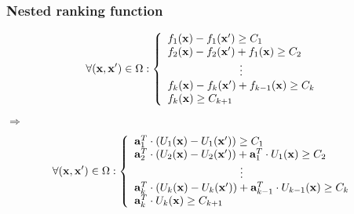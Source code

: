 \begin{frame}
\frametitle{Nested ranking function}
\begin{equation}
		\forall (\varsvec,\varsvec') \in \Omega :
		\left\{
			\begin{array}{ll}
				\affrank_{1}(\varsvec) - \affrank_{1}(\varsvec') \geq C_{1} \\
				\affrank_{2}(\varsvec) - \affrank_{2}(\varsvec') + \affrank_{1}(\varsvec) \geq C_{2} \\
				\multicolumn{1}{c}{\vdots} \\
				\affrank_{k}(\varsvec) - \affrank_{k}(\varsvec') + \affrank_{k-1}(\varsvec) \geq C_{k} \\
				\affrank_{k}(\varsvec) \geq C_{k+1}
			\end{array}
		\right. \notag
		\label{eq:nestedProgress}
\end{equation}
$\Longrightarrow$
\begin{equation}
\forall (\varsvec,\varsvec') \in \Omega :
\left\{
	\begin{array}{ll}
		\vect{a}^{T}_{1} \cdot (U_{1}(\varsvec) - U_{1}(\varsvec')) \geq C_{1} \\
		\vect{a}^{T}_{2} \cdot (U_{2}(\varsvec) - U_{2}(\varsvec')) + \vect{a}^{T}_{1} \cdot U_{1}(\varsvec) \geq C_{2} \\
		\multicolumn{1}{c}{\vdots} \\
		\vect{a}^{T}_{k} \cdot (U_{k}(\varsvec) - U_{k}(\varsvec')) + \vect{a}^{T}_{k-1} \cdot U_{k-1}(\varsvec)\geq C_{k} \\
		\vect{a}^{T}_{k} \cdot U_{k}(\varsvec) \geq C_{k+1}
	\end{array}
\right. \notag
\label{eq:nestedProgressAsAU}
\end{equation}
\end{frame}
